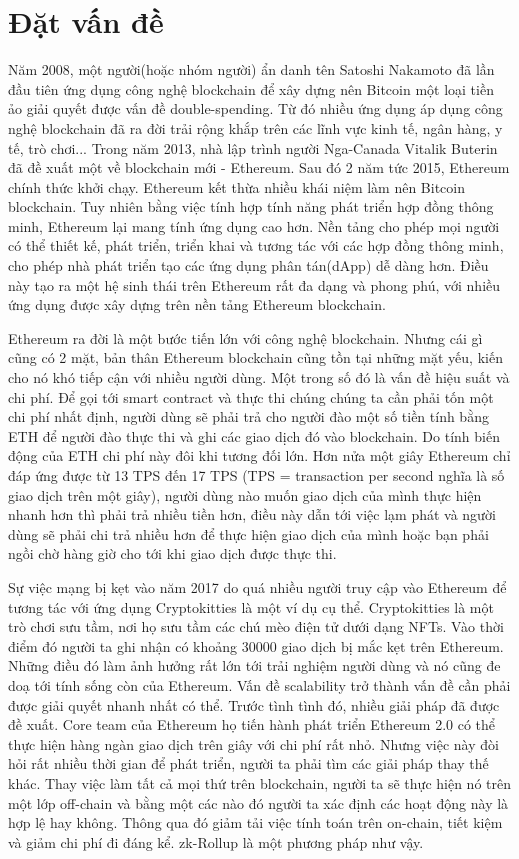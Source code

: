 \documentclass[../thesis.tex]{subfiles}
\begin{document}
\section{Đặt vấn đề}
Năm 2008, một người(hoặc nhóm người) ẩn danh tên Satoshi Nakamoto đã lần đầu tiên ứng dụng công nghệ blockchain để xây dựng nên Bitcoin một loại tiền ảo giải quyết được vấn đề double-spending. Từ đó nhiều ứng dụng áp dụng công nghệ blockchain đã ra đời trải rộng khắp trên các lĩnh vực kinh tế, ngân hàng, y tế, trò chơi... Trong năm 2013, nhà lập trình người Nga-Canada Vitalik Buterin đã đề xuất một về blockchain mới - Ethereum. Sau đó 2 năm tức 2015, Ethereum chính thức khởi chạy. Ethereum kết thừa nhiều khái niệm làm nên Bitcoin blockchain. Tuy nhiên bằng việc tính hợp tính năng phát triển hợp đồng thông minh, Ethereum lại mang tính ứng dụng cao hơn. Nền tảng cho phép mọi người có thể thiết kế, phát triển, triển khai và tương tác với các hợp đồng thông minh, cho phép nhà phát triển tạo các ứng dụng phân tán(dApp) dễ dàng hơn. Điều này tạo ra một hệ sinh thái trên Ethereum rất đa dạng và phong phú, với nhiều ứng dụng được xây dựng trên nền tảng Ethereum blockchain.

Ethereum ra đời là một bước tiến lớn với công nghệ blockchain. Nhưng cái gì cũng có 2 mặt, bản thân Ethereum blockchain cũng tồn tại những mặt yếu, kiến cho nó khó tiếp cận với nhiều người dùng. Một trong số đó là vấn đề hiệu suất và chi phí. Để gọi tới smart contract và thực thi chúng chúng ta cần phải tốn một chi phí nhất định, người dùng sẽ phải trả cho người đào một số tiền tính bằng ETH để người đào thực thi và ghi các giao dịch đó vào blockchain. Do tính biến động của ETH chi phí này đôi khi tương đối lớn. Hơn nửa một giây Ethereum chỉ đáp ứng được từ 13 TPS đến 17 TPS (TPS = transaction per second nghĩa là số giao dịch trên một giây), người dùng nào muốn giao dịch của mình thực hiện nhanh hơn thì phải trả nhiều tiền hơn, điều này dẫn tới việc lạm phát và người dùng sẽ phải chi trả nhiều hơn để thực hiện giao dịch của mình hoặc bạn phải ngồi chờ hàng giờ cho tới khi giao dịch được thực thi.

Sự việc mạng bị kẹt vào năm 2017 do quá nhiều người truy cập vào Ethereum để tương tác với ứng dụng Cryptokitties là một ví dụ cụ thể. Cryptokitties là một trò chơi sưu tầm, nơi họ sưu tầm các chú mèo điện tử dưới dạng NFTs. Vào thời điểm đó người ta ghi nhận có khoảng 30000 giao dịch bị mắc kẹt trên Ethereum. Những điều đó làm ảnh hưởng rất lớn tới trải nghiệm người dùng và nó cũng đe doạ tới tính sống còn của Ethereum. Vấn đề scalability trở thành vấn đề cần phải được giải quyết nhanh nhất có thể.
Trước tình tình đó, nhiều giải pháp đã được đề xuất. Core team của Ethereum họ tiến hành phát triển Ethereum 2.0 có thể thực hiện hàng ngàn giao dịch trên giây với chi phí rất nhỏ. Nhưng việc này đòi hỏi rất nhiều thời gian để phát triển, người ta phải tìm các giải pháp thay thế khác. Thay việc làm tất cả mọi thứ trên blockchain, người ta sẽ thực hiện nó trên một lớp off-chain và bằng một các nào đó người ta xác định các hoạt động này là hợp lệ hay không. Thông qua đó giảm tải việc tính toán trên on-chain, tiết kiệm và giảm chi phí đi đáng kể. zk-Rollup là một phương pháp như vậy.
\end{document}
